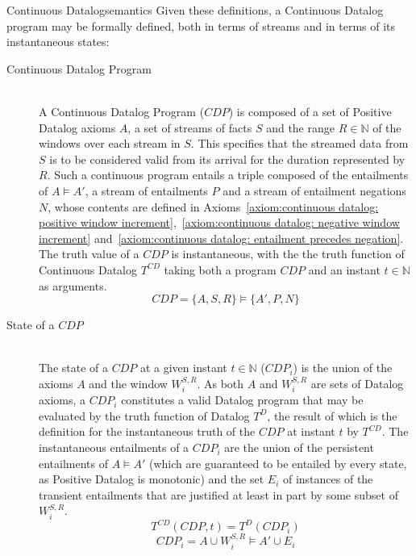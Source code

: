 \begin{nestedsection}{Continuous Datalog}{semantics}
	Given these definitions, a Continuous Datalog program may be formally defined, both in terms of streams and in terms of its instantaneous states:
	\begin{description}
		\item[Continuous Datalog Program\label{def:continuous datalog: CDP}]\hfill\\
			A Continuous Datalog Program (${CDP}$) is composed of a set of Positive Datalog axioms $A$, a set of streams of facts $S$ and the range ${R \in \mathbb{N}}$ of the windows over each stream in $S$.
			This specifies that the streamed data from $S$ is to be considered valid from its arrival for the duration represented by $R$.
			Such a continuous program entails a triple composed of the entailments of ${A \vDash A'}$, a stream of entailments $P$ and a stream of entailment negations $N$, whose contents are defined in Axioms~\ref{axiom:continuous datalog: positive window increment},~\ref{axiom:continuous datalog: negative window increment} and~\ref{axiom:continuous datalog: entailment precedes negation}.
			The truth value of a ${CDP}$ is instantaneous, with the the truth function of Continuous Datalog $T^{CD}$ taking both a program ${CDP}$ and an instant ${t \in \mathbb{N}}$ as arguments.
			\begin{equation*}
				CDP = \{A,S,R\} \vDash \{A',P,N\}
			\end{equation*}
		\item[State of a ${CDP}$\label{def:continuous datalog: CDPt}]\hfill\\
			The state of a ${CDP}$ at a given instant ${t \in \mathbb{N}}$ (${CDP_{i}}$) is the union of the axioms $A$ and the window $W^{S,R}_{i}$.
			As both $A$ and $W^{S,R}_{i}$ are sets of Datalog axioms, a ${CDP_{i}}$ constitutes a valid Datalog program that may be evaluated by the truth function of Datalog $T^{D}$, the result of which is the definition for the instantaneous truth of the ${CDP}$ at instant $t$ by $T^{CD}$.
			The instantaneous entailments of a $CDP_{i}$ are the union of the persistent entailments of ${A \vDash A'}$ (which are guaranteed to be entailed by every state, as Positive Datalog is monotonic) and the set $E_{i}$ of instances of the transient entailments that are justified at least in part by some subset of $W^{S,R}_{i}$. 
			\begin{equation*}
				T^{CD} \left( CDP, t \right) = T^{D} \left( CDP_{i} \right)
			\end{equation*}
			\begin{equation*}
				CDP_{i} = A \cup W^{S,R}_{i} \vDash A' \cup E_{i}

\end{equation*}
\end{description}
\end{nestedsection}
